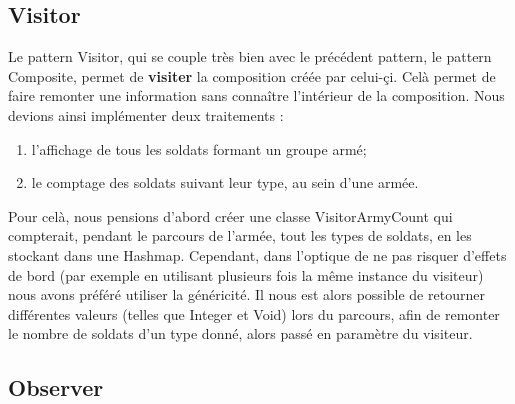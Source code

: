 \documentclass[12pt]{article}
\begin{document}
\subsection{Visitor}
Le pattern Visitor, qui se couple très bien avec le précédent pattern, le pattern Composite, permet de \textbf{visiter} la composition créée par celui-çi. Celà permet de faire remonter une information sans connaître l'intérieur de la composition.
Nous devions ainsi implémenter deux traitements :
\begin{enumerate}
 \item l'affichage de tous les soldats formant un groupe armé;
 \item le comptage des soldats suivant leur type, au sein d'une armée.
\end{enumerate}
Pour celà, nous pensions d'abord créer une classe VisitorArmyCount qui compterait, pendant le parcours de l'armée, tout les types de soldats, en les stockant dans une Hashmap. Cependant, dans l'optique de ne pas risquer d'effets de bord (par exemple en utilisant plusieurs fois la même instance du visiteur) nous avons préféré utiliser la généricité. Il nous est alors possible de retourner différentes valeurs (telles que Integer et Void) lors du parcours, afin de remonter le nombre de soldats d'un type donné, alors passé en paramètre du visiteur.
\subsection{Observer}
\end{document}
